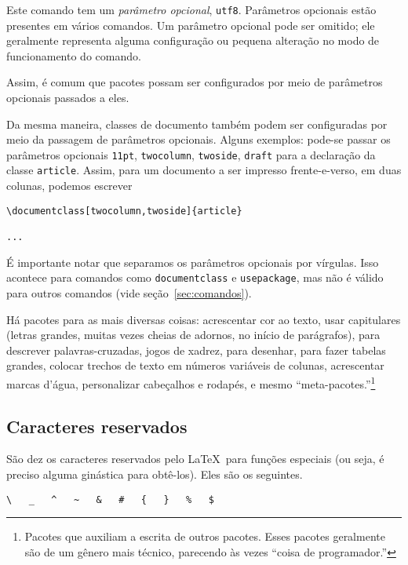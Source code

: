 Este comando tem um \emph{parâmetro opcional},
\texttt{utf8}. Parâmetros opcionais estão presentes em vários
comandos. Um parâmetro opcional pode ser omitido; ele geralmente
representa alguma configuração ou pequena alteração no modo de
funcionamento do comando.

Assim, é comum que pacotes possam ser configurados por meio de
parâmetros opcionais passados a eles.

Da mesma maneira, classes de documento também podem ser configuradas
por meio da passagem de parâmetros opcionais. Alguns exemplos: pode-se
passar os parâmetros opcionais \texttt{11pt}, \texttt{twocolumn},
\texttt{twoside}, \texttt{draft} para a declaração da classe
\texttt{article}. Assim, para um documento a ser impresso
frente-e-verso, em duas colunas, podemos escrever
\begin{footnotesize}
\begin{verbatim}
\documentclass[twocolumn,twoside]{article}

...

\end{verbatim}
\end{footnotesize}

É importante notar que separamos os parâmetros opcionais por
vírgulas. Isso acontece para comandos como \texttt{documentclass} e
\texttt{usepackage}, mas não é válido para outros comandos (vide
seção~\ref{sec:comandos}).

Há pacotes para as mais diversas coisas: acrescentar cor ao texto,
usar capitulares (letras grandes, muitas vezes cheias de adornos, no
início de parágrafos), para descrever palavras-cruzadas, jogos de
xadrez, para desenhar, para fazer tabelas grandes, colocar trechos de
texto em números variáveis de colunas, acrescentar marcas d'água,
personalizar cabeçalhos e rodapés, e mesmo
``meta-pacotes.''\footnote{Pacotes que auxiliam a escrita de outros
  pacotes. Esses pacotes geralmente são de um gênero mais técnico,
  parecendo às vezes ``coisa de programador.''}

\subsection{Caracteres reservados}

São dez os caracteres reservados pelo \LaTeX\ para funções especiais
(ou seja, é preciso alguma ginástica para obtê-los). Eles são os seguintes.

\begin{center}
\verb'\   _   ^   ~   &   #   {   }   %   $'
\end{center}

